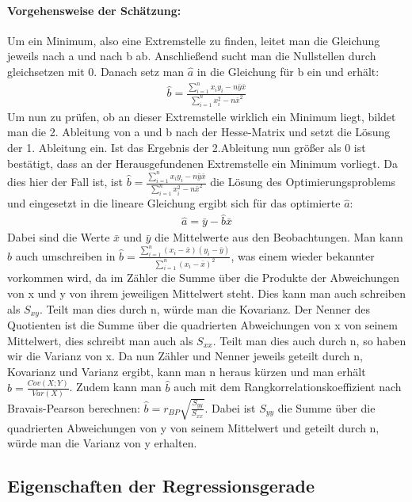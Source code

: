 \documentclass[a4paper]{article}
\begin{document}
\paragraph{Vorgehensweise der Schätzung:} Um ein Minimum, also eine Extremstelle zu finden, leitet man die Gleichung jeweils nach a und nach b ab. Anschließend sucht man die Nullstellen durch gleichsetzen mit 0. Danach setz man $\hat{a}$ in die Gleichung für b ein und erhält: 
\begin{align*}
    \hat{b}=\frac{\sum_{i=1}^nx_iy_i-n\bar{y}\bar{x}}{\sum_{i=1}^nx_i^{2}-n\bar{x}^{2}}
\end{align*}
Um nun zu prüfen, ob an dieser Extremstelle wirklich ein Minimum liegt, bildet man die 2. Ableitung von a und b nach der Hesse-Matrix und setzt die Lösung der 1. Ableitung ein. Ist das Ergebnis der 2.Ableitung nun größer als 0 ist bestätigt, dass an der Herausgefundenen Extremstelle ein Minimum vorliegt. Da dies hier der Fall ist, ist $\hat{b}=\frac{\sum_{i=1}^nx_iy_i-n\bar{y}\bar{x}}{\sum_{i=1}^nx_i^{2}-n\bar{x}^{2}}$ die Lösung des Optimierungsproblems und eingesetzt in die lineare Gleichung ergibt sich für das optimierte $\hat{a}$:
\begin{align*}
    \hat{a}=\bar{y}-\hat{b}\bar{x}
\end{align*}
Dabei sind die Werte $\bar{x}$ und $\bar{y}$ die Mittelwerte aus den Beobachtungen.
Man kann $\hat{b}$ auch umschreiben in $\hat{b}=\frac{\sum_{i=1}^n(x_i-\bar{x})(y_i-\bar{y})}{\sum_{i=1}^n(x_i-\bar{x})^{2}}$, was einem wieder bekannter vorkommen wird, da im Zähler die Summe über die Produkte der Abweichungen von x und y von ihrem jeweiligen Mittelwert steht. Dies kann man auch schreiben als $S_{xy}$. Teilt man dies durch n, würde man die Kovarianz. Der Nenner des Quotienten ist die Summe über die quadrierten Abweichungen von x von seinem Mittelwert, dies schreibt man auch als $S_{xx}$. Teilt man dies auch durch n, so haben wir die Varianz von x. Da nun Zähler und Nenner jeweils geteilt durch n, Kovarianz und Varianz ergibt, kann man n heraus kürzen und man erhält $\hat{b}=\frac{Cov(X;Y)}{Var(X)}$. Zudem kann man $\hat{b}$ auch mit dem Rangkorrelationskoeffizient nach Bravais-Pearson berechnen: $\hat{b}=r_{BP}\sqrt{\frac{S_{yy}}{S_{xx}}}$. Dabei ist $S_{yy}$ die Summe über die quadrierten Abweichungen von y von seinem Mittelwert und geteilt durch n, würde man die Varianz von y erhalten.

\subsection{Eigenschaften der Regressionsgerade}
\end{document}
